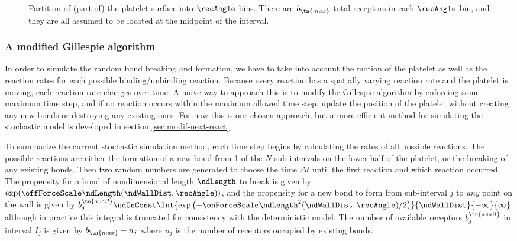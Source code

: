 \begin{figure}
  \centering
  
  \caption[Partition of (part of) the platelet surface into
  $\recAngle$-bins.]{Partition of (part of) the platelet surface into
    $\recAngle$-bins. There are $b_\tn{max}$ total receptors in each
    $\recAngle$-bin, and they are all assumed to be located at the
    midpoint of the interval.}
  \label{fig:plt-bins}
\end{figure}

\subsubsection{A modified Gillespie algorithm}
\label{sec:modif-gill-algor}

In order to simulate the random bond breaking and formation, we have
to take into account the motion of the platelet as well as the
reaction rates for each possible binding/unbinding reaction. Because
every reaction has a spatially varying reaction rate and the platelet
is moving, each reaction rate changes over time. A naive way to
approach this is to modify the Gillespie algorithm by enforcing some
maximum time step, and if no reaction occurs within the maximum
allowed time step, update the position of the platelet without
creating any new bonds or destroying any existing ones. For now this
is our chosen approach, but a more efficient method for simulating the
stochastic model is developed in section \ref{sec:modif-next-react}

To summarize the current stochastic simulation method, each time step
begins by calculating the rates of all possible reactions. The
possible reactions are either the formation of a new bond from 1 of
the $N$ sub-intervals on the lower half of the platelet, or the
breaking of any existing bonds. Then two random numbers are generated
to choose the time $\Delta t$ until the first reaction and which
reaction occurred. The propensity for a bond of nondimensional length
$\ndLength$ to break is given by
$\exp(\offForceScale \ndLength(\ndWallDist, \recAngle))$, and the
propensity for a new bond to form from sub-interval $j$ to \emph{any}
point on the wall is given by
$b_j^\tn{avail} \ndOnConst\Int{\exp\left(-\onForceScale \ndLength^2
  (\ndWallDist, \recAngle)/2\right)} {\ndWallDist} {-\infty} {\infty}$
although in practice this integral is truncated for consistency with
the deterministic model. The number of available receptors
$b_j^\tn{avail}$ in interval $I_j$ is given by $b_\tn{max} - n_j$
where $n_j$ is the number of receptors occupied by existing bonds.

